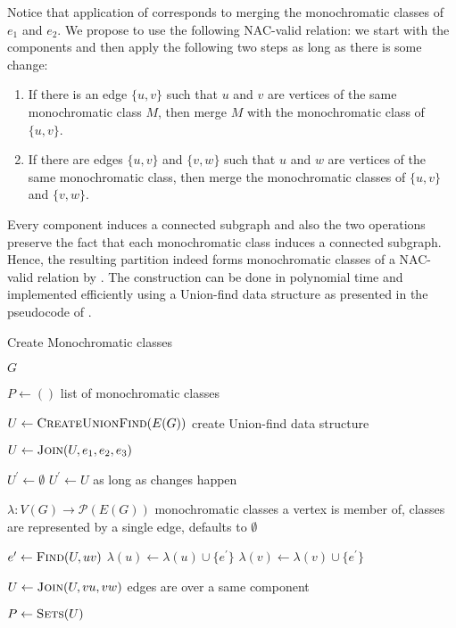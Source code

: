 Notice that application of  corresponds
to merging the monochromatic classes of $e_1$ and $e_2$.
We propose to use the following NAC-valid relation:
we start with the \trcon{} components and then apply the following two steps
as long as there is some change:
%
\begin{enumerate}
	\item If there is an edge \( \{u, v\} \) such that $u$ and $v$ are vertices of
	      the same monochromatic class $M$, then merge $M$ with the monochromatic class of \( \{u, v\} \).
	\item If there are edges \( \{u, v\} \) and \( \{v, w\} \) such that $u$ and $w$ are vertices of
	      the same monochromatic class, then merge the monochromatic classes of \( \{u, v\} \) and \( \{v, w\} \).
\end{enumerate}
%
Every \trcon{} component induces a connected subgraph and also the two operations preserve
the fact that each monochromatic class induces a connected subgraph.
Hence, the resulting partition indeed forms monochromatic classes
of a NAC-valid relation by .
The construction can be done in polynomial time
and implemented efficiently using a Union-find data structure
as presented in the pseudocode of .

\begin{algorithm}
	\caption{Create Monochromatic classes~\cite{my_paper}}%
	\label{alg:create_monochromatic classes}
	\begin{algorithmic}[1]
		\Require{} $G$

		\Ensure{} $P \gets ()$
		\Comment{} list of monochromatic classes

		\State{} $U \gets \Call{CreateUnionFind}{E(G)}$
		\Comment{} create Union-find data structure

		\State{} $U \gets \Call{Join}{U, e_{1}, e_{2}, e_{3}}$
		\EndFor{}

		\State{} $U^\prime \gets \emptyset$
		\State{} $U^\prime \gets U$
		\Comment{} as long as changes happen

		\State{} $\lambda : V(G) \to \mathcal{P}(E(G))$
		\Comment{} monochromatic classes a vertex is member of,
		\State{}
		\Comment{} classes are represented by a single edge, defaults to $\emptyset$

		\State{} $e^\prime \gets \Call{Find}{U, uv}$
		\State{} $\lambda(u) \gets \lambda(u) \cup \{e^\prime\}$
		\State{} $\lambda(v) \gets \lambda(v) \cup \{e^\prime\}$
		\EndFor{}

		\State{} $U \gets \Call{Join}{U, vu, vw}$
		\Comment{} edges are over a same component
		\EndIf{}
		\EndFor{}
		\EndWhile{}

		\State{} $P \gets \Call{Sets}{U}$

	\end{algorithmic}
\end{algorithm}


